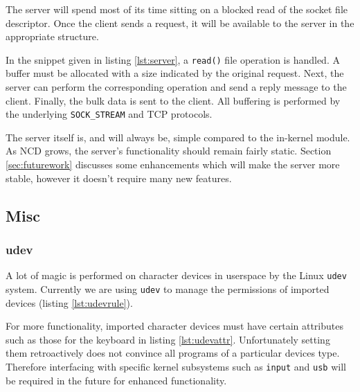 \documentclass[11pt,twocolumn]{article}
\begin{document}


The server will spend most of its time sitting on a blocked read of the
socket file descriptor. Once the client sends a request, it will be
available to the server in the appropriate structure.

In the snippet given in listing \ref{lst:server}, a \texttt{read()} file
operation is handled. A buffer must be allocated with a size
indicated by the original request. Next, the server can perform the
corresponding operation and send a reply message to the client. Finally,
the bulk data is sent to the client. All buffering is performed by the
underlying \texttt{SOCK\_STREAM} and TCP protocols.

The server itself is, and will always be, simple compared to the
in-kernel module. As NCD grows, the server's functionality should remain
fairly static. Section \ref{sec:futurework} discusses some enhancements
which will make the server more stable, however it doesn't require many
new features.

\subsection{Misc}

\subsubsection{udev}
\label{subsec:udev}



A lot of magic is performed on character devices in userspace by
the Linux \texttt{udev} system.
Currently we are using \texttt{udev} to manage the
permissions of imported devices (listing \ref{lst:udevrule}).



For more functionality, imported character devices must have certain
attributes such as those for the keyboard in listing \ref{lst:udevattr}.
Unfortunately setting them retroactively does not convince all programs
of a particular devices type. Therefore interfacing with specific kernel
subsystems such as \texttt{input} and \texttt{usb} will be required in
the future for enhanced functionality.
\end{document}
